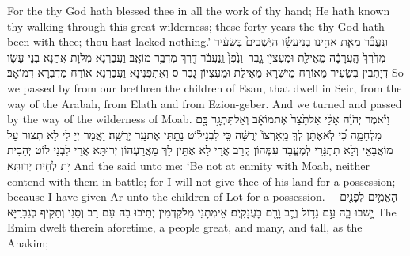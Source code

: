 {For the \lord\space thy God hath blessed thee in all the work of thy hand; He hath known thy walking through this great wilderness; these forty years the \lord\space thy God hath been with thee; thou hast lacked nothing.’}{}
{וַֽנַּעֲבֹ֞ר מֵאֵ֧ת אַחֵ֣ינוּ בְנֵי\maqqaf עֵשָׂ֗ו הַיֹּֽשְׁבִים֙ בְּשֵׂעִ֔יר מִדֶּ֙רֶךְ֙ הָֽעֲרָבָ֔ה מֵאֵילַ֖ת וּמֵעֶצְיֹ֣ן גָּ֑בֶר \setuma  וַנֵּ֙פֶן֙ וַֽנַּעֲבֹ֔ר דֶּ֖רֶךְ מִדְבַּ֥ר מוֹאָֽב׃}
{וַעֲבַרְנָא מִלְּוָת אֲחַנָא בְנֵי עֵשָׂו דְּיָתְבִין בְּשֵׂעִיר מֵאוֹרַח מֵישְׁרָא מֵאֵילַת וּמֵעֶצְיוֹן גָּבֶר ס וְאִתְפְּנִינָא וַעֲבַרְנָא אוֹרַח מַדְבְּרָא דְּמוֹאָב׃}
{So we passed by from our brethren the children of Esau, that dwell in Seir, from the way of the Arabah, from Elath and from Ezion-geber. And we turned and passed by the way of the wilderness of Moab.}{}
{וַיֹּ֨אמֶר יְהֹוָ֜ה אֵלַ֗י אַל\maqqaf תָּ֙צַר֙ אֶת\maqqaf מוֹאָ֔ב וְאַל\maqqaf תִּתְגָּ֥ר בָּ֖ם מִלְחָמָ֑ה כִּ֠י לֹֽא\maqqaf אֶתֵּ֨ן לְךָ֤ מֵֽאַרְצוֹ֙ יְרֻשָּׁ֔ה כִּ֣י לִבְנֵי\maqqaf ל֔וֹט נָתַ֥תִּי אֶת\maqqaf עָ֖ר יְרֻשָּֽׁה׃}
{וַאֲמַר יְיָ לִי לָא תְצוּר עַל מוֹאֲבָאֵי וְלָא תִתְגָּרֵי לְמֶעֱבַד עִמְּהוֹן קְרָב אֲרֵי לָא אֶתֵּין לָךְ מֵאֲרַעְהוֹן יְרוּתָּא אֲרֵי לִבְנֵי לוֹט יְהַבִית יָת לְחָיַת יְרוּתָּא׃}
{And the \lord\space said unto me: ‘Be not at enmity with Moab, neither contend with them in battle; for I will not give thee of his land for a possession; because I have given Ar unto the children of Lot for a possession.—}{}
{הָאֵמִ֥ים לְפָנִ֖ים יָ֣שְׁבוּ בָ֑הּ עַ֣ם גָּד֥וֹל וְרַ֛ב וָרָ֖ם כָּעֲנָקִֽים׃}
{אֵימְתָנֵי מִלְּקַדְמִין יְתִיבוּ בַהּ עַם רַב וְסַגִּי וְתַקִּיף כְּגִבָּרַיָּא׃}
{The Emim dwelt therein aforetime, a people great, and many, and tall, as the Anakim;}{}
